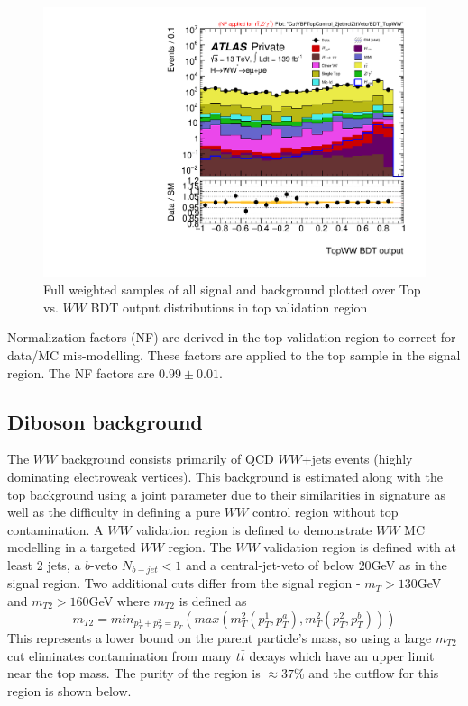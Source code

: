 \begin{figure}[!htbp]
\centering
\includegraphics[width=.6\linewidth]{Pictures/run2-emme-CutVBFTopControl_2jetinclZttVeto-BDT_TopWW-log.pdf}
\caption{Full weighted samples of all signal and background plotted over Top vs. $WW$ BDT output distributions in top validation region}
\label{fig:TopWWBDTVR}
\end{figure}

Normalization factors (NF) are derived in the top validation region to correct for data/MC mis-modelling. These factors are applied to the top sample in the signal region. The NF factors are $0.99\pm0.01$. 

\subsection{Diboson background}

The $WW$ background consists primarily of QCD $WW$+jets events (highly dominating electroweak vertices). This background is estimated along with the top background using a joint parameter due to their similarities in signature as well as the difficulty in defining a pure $WW$ control region without top contamination. A $WW$ validation region is defined to demonstrate $WW$ MC modelling in a targeted $WW$ region.  The $WW$ validation region is defined with at least 2 jets, a $b$-veto $N_{b-jet}<1$ and a central-jet-veto of below $20$GeV as in the signal region. Two additional cuts differ from the signal region - $m_T>130$GeV and $m_{T2}>160$GeV where $m_{T2}$ is defined as
\begin{equation}
m_{T2}=min_{p_T^1+p_T^2=p_T}(max(m_T^2(p_T^1,p_T^a),m_T^2(p_T^2,p_T^b)))
\end{equation}
This represents a lower bound on the parent particle's mass, so using a large $m_{T2}$ cut eliminates contamination from many $t\bar{t}$ decays which have an upper limit near the top mass. The purity of the region is $\approx 37\%$ and the cutflow for this region is shown below.

